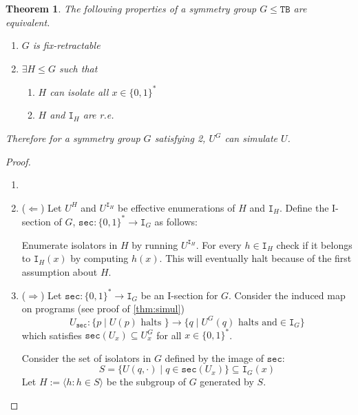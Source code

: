 \documentclass{article}
\newtheorem{theorem}{Theorem}[section]
\newcommand{\bin}{\{0,1\}^*} %
\newcommand{\TB}{\mathtt{TB}}
\newcommand{\I}{\mathtt{I}}
\newcommand{\s}{\mathtt{sec}}
\begin{document}
\begin{theorem} 
    \label{thm:alg}
    The following properties of a symmetry group $G \leq \TB$ are equivalent.
    \begin{enumerate}
        \item $G$ is fix-retractable 
        \item $\exists H \leq G$ such that
        \begin{enumerate}
            \item $H$ can isolate all $x \in \bin$
            \item $H$ and $\I_H$ are r.e.
        \end{enumerate}
    \end{enumerate}
    Therefore for a symmetry group $G$ satisfying 2, $U^G$ can simulate $U$.
\end{theorem}

\begin{proof}
\begin{enumerate}
    \item[]
    \item ($\Leftarrow$)
    Let $U^H$ and $U^{\I_H}$ be effective enumerations of $H$ and $\I_H$. Define the I-section of $G$, $\s: \bin \to \I_G$ as follows: 

    Enumerate isolators in $H$ by running $U^{\I_H}$. For every $h \in \I_H$ check if it belongs to $\I_H(x)$ by computing $h(x)$. This will eventually halt because of the first assumption about $H$. 

    \item ($\Rightarrow$)
    Let $\s: \bin \to \I_G$ be an I-section for $G$. Consider the induced map on programs (see proof of \ref{thm:simul})
    \begin{equation}
        U_{\s}: \{ p \mid U(p) \text{ halts }\} \to \{q \mid U^G(q) \text{ halts and} \in \I_G\}
    \end{equation}
    which satisfies $\s(U_x) \subseteq U^G_x$ for all $x \in \bin$. 

    Consider the set of isolators in $G$ defined by the image of $\s$:
    \begin{equation}
        S = \{ U(q, \cdot) \mid q \in \s(U_x) \} \subseteq \I_G(x)
    \end{equation}
    Let $H := \langle h : h \in S \rangle$ be the subgroup of $G$ generated by $S$. 

\end{enumerate}
\end{proof}
\end{document}
